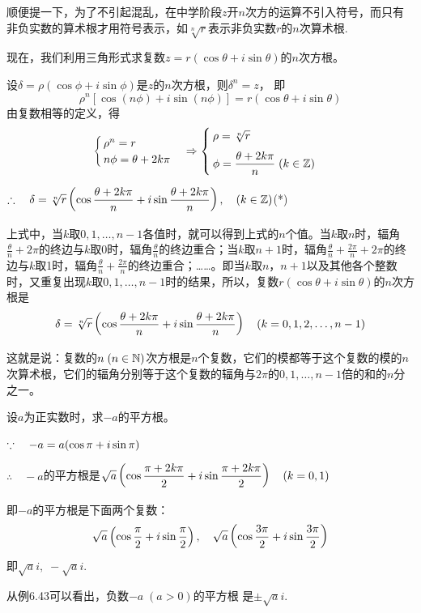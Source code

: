 顺便提一下，为了不引起混乱，在中学阶段$z$开$n$次方的运算不引入符号，而只有非负实数的算术根才用符号表示，如$\sqrt[n]{r}$表示非负实数$r$的$n$次算术根.

现在，我们利用三角形式求复数$z=r(\cos\theta+i\sin\theta)$的$n$次方根。

设$\delta =\rho(\cos\phi+i\sin\phi)$是$z$的$n$次方根，则$\delta^n=z$，
即
\[\rho^n[\cos(n\phi)+i\sin(n\phi)]=r(\cos\theta+i\sin\theta)\]
由复数相等的定义，得
\[\begin{cases}
    \rho^n=r\\
    n\phi=\theta+2k\pi
\end{cases}\Rightarrow \begin{cases}
    \rho=\sqrt[n]{r}\\[1.5ex] \phi=\dfrac{\theta+2k\pi}{n}\; (k\in\mathbb{Z})
\end{cases}\]

$\therefore\quad \delta=\sqrt[n]{r}\left(\cos\dfrac{\theta+2k\pi}{n}+i\sin\dfrac{\theta+2k\pi}{n}\right),\quad (k\in\mathbb{Z})$\hfill (*)

上式中，当$k$取$0,1,\ldots,n-1$各值时，就可以得到上式的$n$个值。当$k$取$n$时，辐角$\frac{\theta}{n}+2\pi$的终边与$k$取0时，辐角$\frac{\theta}{n}$的终边重合；当$k$取$n+1$时，辐角$\frac{\theta}{n}+\frac{2\pi}{n}+2\pi$的终边与$k$取1时，辐角$\frac{\theta}{n}+\frac{2\pi}{n}$的终边重合；……。即当$k$取$n$，$n+1$以及其他各个整数时，又重复出现$k$取$0,1,\ldots,n-1$时的结果，所以，复数$r(\cos\theta+i\sin\theta)$的$n$次方根是
\[\delta=\sqrt[n]{r}\left(\cos\dfrac{\theta+2k\pi}{n}+i\sin\dfrac{\theta+2k\pi}{n}\right)\quad (k=0,1,2,\ldots,n-1)\]

这就是说：复数的$n\; (n\in\mathbb{N})$次方根是$n$个复数，它们的模都等于这个复数的模的$n$次算术根，它们的辐角分别等于这个复数的辐角与$2\pi$的$0,1,\ldots,n-1$倍的和的$n$分之一。

\begin{example}
    设$a$为正实数时，求$-a$的平方根。
\end{example}

\begin{solution}
$\because\quad -a=a(\cos\pi+i\sin\pi)$

$\therefore\quad -a$的平方根是$\sqrt{a}\left(\cos\dfrac{\pi+2k\pi}{2}+i\sin\dfrac{\pi+2k\pi}{2}\right)\quad (k=0,1)$

即$-a$的平方根是下面两个复数：
\[\sqrt{a}\left(\cos\dfrac{\pi}{2}+i\sin\dfrac{\pi}{2}\right),\quad \sqrt{a}\left(\cos\dfrac{3\pi}{2}+i\sin\dfrac{3\pi}{2}\right)\]
即$\sqrt{a}i,\; -\sqrt{a}i$.
\end{solution}

\begin{note}
    从例6.43可以看出，负数$-a\; (a>0)$的平方根 是$\pm\sqrt{a}i$.
\end{note}


